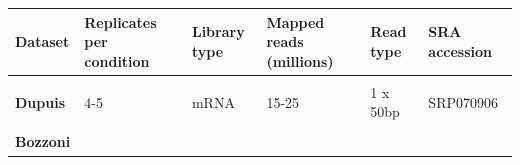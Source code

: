 \begin{longtable}[]{@{}llllll@{}}
	\begin{minipage}[t]{0.14\columnwidth}\raggedright\strut
		{\textbf{Dataset}}\strut
	\end{minipage} & \begin{minipage}[t]{0.14\columnwidth}\raggedright\strut
		{\textbf{Replicates per condition}}\strut
	\end{minipage} & \begin{minipage}[t]{0.14\columnwidth}\raggedright\strut
		{\textbf{Library type}}\strut
	\end{minipage} & \begin{minipage}[t]{0.14\columnwidth}\raggedright\strut
		{\textbf{Mapped reads (millions)}}\strut
	\end{minipage} & \begin{minipage}[t]{0.14\columnwidth}\raggedright\strut
		{\textbf{Read type}}\strut
	\end{minipage} & \begin{minipage}[t]{0.14\columnwidth}\raggedright\strut
		{\textbf{SRA accession}}\strut
	\end{minipage}\tabularnewline\toprule \\[-0.3cm]
	\begin{minipage}[t]{0.14\columnwidth}\raggedright\strut
		{\textbf{Dupuis}}\strut
	\end{minipage} & \begin{minipage}[t]{0.14\columnwidth}\raggedright\strut
		{4-5}\strut
	\end{minipage} & \begin{minipage}[t]{0.14\columnwidth}\raggedright\strut
		{mRNA}\strut
	\end{minipage} & \begin{minipage}[t]{0.14\columnwidth}\raggedright\strut
		{15-25}\strut
	\end{minipage} & \begin{minipage}[t]{0.14\columnwidth}\raggedright\strut
		{1 x 50bp}\strut
	\end{minipage} & \begin{minipage}[t]{0.14\columnwidth}\raggedright\strut
		{SRP070906 }\strut
	\end{minipage}\tabularnewline \\
	\begin{minipage}[t]{0.14\columnwidth}\raggedright\strut
		{\textbf{Bozzoni} }\strut
	\end{minipage} & \begin{minipage}[t]{0.14\columnwidth}\raggedright\strut

\end{minipage}
\end{longtable}
